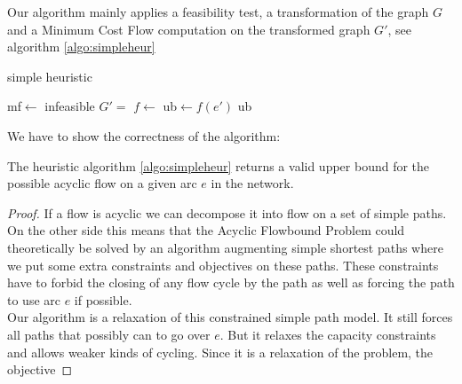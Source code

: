 Our algorithm mainly applies a feasibility test, a transformation of the graph $G$ and a Minimum Cost Flow computation 
on the transformed graph $G'$, see algorithm \ref{algo:simpleheur}

\begin{algorithm}
 \caption{simple heuristic}
 \label{algo:simpleheur}
 \begin{algorithmic}
  \State mf$\gets$ 
    \State\Return infeasible
  \EndIf
  \State $G'=$ 
  \State $f\gets$ 
  \State ub$\gets f(e')$
  \State \Return ub
  \EndFunction
 \end{algorithmic}
\end{algorithm}

We have to show the correctness of the algorithm: %

\begin{prop}
 The heuristic algorithm \ref{algo:simpleheur} returns a valid upper bound for the possible acyclic flow on a given 
  arc $e$ in the network.
\end{prop}

\begin{proof}
 If a flow is acyclic we can decompose it into flow on a set of simple paths. On the other side this means that the 
Acyclic Flowbound Problem could theoretically be solved by an algorithm augmenting simple shortest paths where we put 
some extra constraints and objectives on these paths. These constraints have to forbid the closing of any flow cycle by 
the path as well as forcing the path to use arc $e$ if possible. \\ %

Our algorithm is a relaxation of this constrained simple path model. It still forces all paths that possibly can to go 
over $e$. But it relaxes the capacity constraints and allows weaker kinds of cycling.
Since it is a relaxation of the problem, the objective 

% 
\end{proof}




